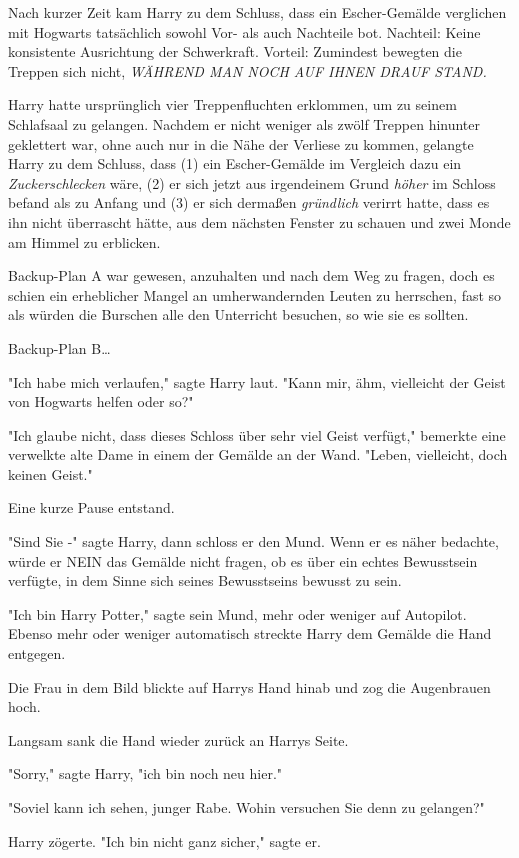 {Nach kurzer Zeit kam Harry zu dem Schluss, dass ein Escher-Gemälde verglichen mit Hogwarts tatsächlich sowohl Vor- als auch Nachteile bot. Nachteil: Keine konsistente Ausrichtung der Schwerkraft. Vorteil: Zumindest bewegten die Treppen sich nicht, \emph{WÄHREND MAN NOCH AUF IHNEN DRAUF STAND.}

Harry hatte ursprünglich vier Treppenfluchten erklommen, um zu seinem Schlafsaal zu gelangen. Nachdem er nicht weniger als zwölf Treppen hinunter geklettert war, ohne auch nur in die Nähe der Verliese zu kommen, gelangte Harry zu dem Schluss, dass (1) ein Escher-Gemälde im Vergleich dazu ein \emph{Zuckerschlecken} wäre, (2) er sich jetzt aus irgendeinem Grund \emph{höher} im Schloss befand als zu Anfang und (3) er sich dermaßen \emph{gründlich} verirrt hatte, dass es ihn nicht überrascht hätte, aus dem nächsten Fenster zu schauen und zwei Monde am Himmel zu erblicken.

Backup-Plan A war gewesen, anzuhalten und nach dem Weg zu fragen, doch es schien ein erheblicher Mangel an umherwandernden Leuten zu herrschen, fast so als würden die Burschen alle den Unterricht besuchen, so wie sie es sollten.

Backup-Plan B…

"Ich habe mich verlaufen," sagte Harry laut. "Kann mir, ähm, vielleicht der Geist von Hogwarts helfen oder so?"

"Ich glaube nicht, dass dieses Schloss über sehr viel Geist verfügt," bemerkte eine verwelkte alte Dame in einem der Gemälde an der Wand. "Leben, vielleicht, doch keinen Geist."

Eine kurze Pause entstand.

"Sind Sie -" sagte Harry, dann schloss er den Mund. Wenn er es näher bedachte, würde er NEIN das Gemälde nicht fragen, ob es über ein echtes Bewusstsein verfügte, in dem Sinne sich seines Bewusstseins bewusst zu sein.

"Ich bin Harry Potter," sagte sein Mund, mehr oder weniger auf Autopilot. Ebenso mehr oder weniger automatisch streckte Harry dem Gemälde die Hand entgegen.

Die Frau in dem Bild blickte auf Harrys Hand hinab und zog die Augenbrauen hoch.

Langsam sank die Hand wieder zurück an Harrys Seite.

"Sorry," sagte Harry, "ich bin noch neu hier."

"Soviel kann ich sehen, junger Rabe. Wohin versuchen Sie denn zu gelangen?"

Harry zögerte. "Ich bin nicht ganz sicher," sagte er.

}
